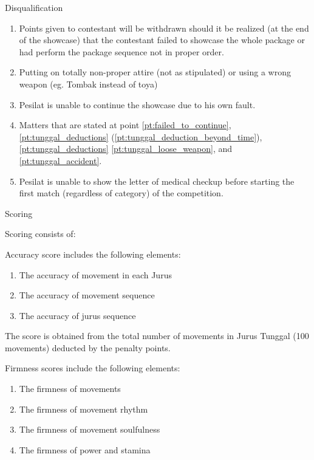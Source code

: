 \begin{legal}
\begin{legal}
            \item Disqualification \\
                \begin{enumerate}[label*=\arabic*.]
                \item Points given to contestant will be withdrawn should it be realized 
                    (at the end of the showcase) that the contestant failed to showcase the whole package or 
                    had perform the package sequence not in proper order.
                \item Putting on totally non-proper attire (not as stipulated) or using a wrong weapon 
                    (eg. Tombak instead of toya)
                \item Pesilat is unable to continue the showcase due to his own fault.
                \item Matters that are stated at point \ref{pt:failed_to_continue}, \ref{pt:tunggal_deductions} (\ref{pt:tunggal_deduction_beyond_time}), \ref{pt:tunggal_deductions} \ref{pt:tunggal_loose_weapon}, and \ref{pt:tunggal_accident}.
                \item Pesilat is unable to show the letter of medical checkup before starting the first match (regardless of category) of the competition.
                \end{enumerate}

    \end{legal}

\item Scoring
    \begin{legal}
    \item Scoring consists of:
        \begin{legal}
        \item Accuracy score includes the following elements:
            \begin{enumerate}[label*=\alph*.]
            \item The accuracy of movement in each Jurus
            \item The accuracy of movement sequence
            \item The accuracy of jurus sequence

            \end{enumerate}

        The score is obtained from the total number of movements in Jurus Tunggal (100 movements) 
        deducted by the penalty points.

        \item Firmness scores include the following elements:
            \begin{enumerate}[label*=\alph*.]
            \item The firmness of movements
            \item The firmness of movement rhythm
            \item The firmness of movement soulfulness
            \item The firmness of power and stamina
            \end{enumerate}


\end{legal}
\end{legal}
\end{legal}
